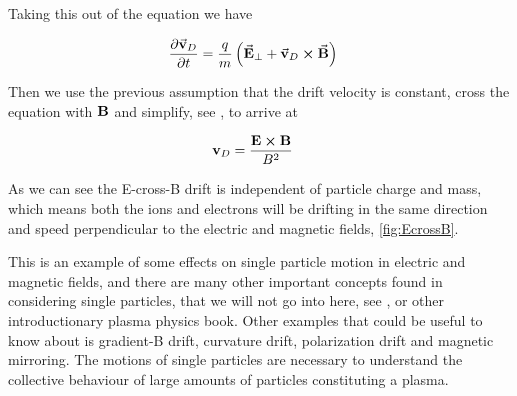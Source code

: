 	Taking this out of the equation we have

	\begin{align}
		\pdv{\va{v}_D}{t} &= \frac{q}{m} \left( \va{E}_\perp + \va{v}_D \cross \va{B} \right)
	\end{align}

	Then we use the previous assumption that the drift velocity is constant,
	cross the equation with \(\vb{B}\) and simplify, see \citet{goldston_introduction_1995},
	to arrive at

	\begin{align}
		\vb{v}_D &= \frac{\vb{E}\cross\vb{B}}{B^2}
	\end{align}

	As we can see the E-cross-B drift is independent of particle charge and mass,
	which means both the ions and electrons will be drifting in the same direction and
	speed perpendicular to the electric and magnetic fields, \cref{fig:EcrossB}.

	This is an example of some effects on single particle motion in electric and magnetic fields, and there are many other important concepts found in
	considering single particles, that we will not go into here, see \citet{fitzpatrick_plasma_2014},
	or other introductionary plasma physics book.
	Other examples that could be useful to know about is gradient-B drift, curvature drift,
	polarization drift and magnetic mirroring. The motions of single particles are necessary
	to understand the collective behaviour of large amounts of particles constituting a plasma.
